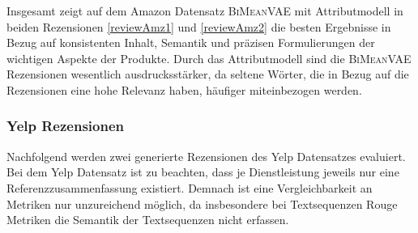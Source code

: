 
Insgesamt zeigt auf dem Amazon Datensatz \textsc{BiMeanVAE} mit Attributmodell in beiden Rezensionen \ref{reviewAmz1} und \ref{reviewAmz2} die besten Ergebnisse in Bezug auf konsistenten Inhalt, Semantik und präzisen Formulierungen der wichtigen Aspekte der Produkte.
Durch das Attributmodell sind die \textsc{BiMeanVAE} Rezensionen wesentlich ausdrucksstärker, da seltene Wörter, die in Bezug auf die Rezensionen eine hohe Relevanz haben, häufiger miteinbezogen werden.

\pagebreak
\subsubsection{Yelp Rezensionen} %
Nachfolgend werden zwei generierte Rezensionen des Yelp Datensatzes evaluiert. 
Bei dem Yelp Datensatz ist zu beachten, dass je Dienstleistung jeweils nur eine Referenzzusammenfassung existiert.
Demnach ist eine Vergleichbarkeit an Metriken nur unzureichend möglich, da insbesondere bei Textsequenzen Rouge Metriken die Semantik der Textsequenzen nicht erfassen.

